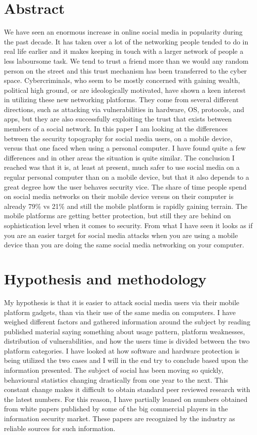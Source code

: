 \section*{Abstract}
We have seen an enormous increase in online social media in popularity during the past decade. It has taken over a lot of the networking people tended to do in real life earlier and it makes keeping in touch with a larger network of people a less laboursome task. We tend to trust a friend more than we would any random person on the street and this trust mechanism has been transferred to the cyber space. Cybercriminals, who seem to be mostly concerned with gaining wealth, political high ground, or are ideologically motivated, have shown a keen interest in utilizing these new networking platforms. They come from several different directions, such as attacking via vulnerabilities in hardware, OS, protocols, and apps, but they are also successfully exploiting the trust that exists between members of a social network.
In this paper I am looking at the differences between the security topography for social media users, on a mobile device, versus that one faced when using a personal computer. I have found quite a few differences and in other areas the situation is quite similar. The conclusion I reached was that it is, at least at present, much safer to use social media on a regular personal computer than on a mobile device, but that it also depends to a great degree how the user behaves security vice. The share of time people spend on social media networks on their mobile device versus on their computer is already 79\% vs 21\% \cite{CrossPlatform2016} and still the mobile platform is rapidly gaining terrain. The mobile platforms are getting better protection, but still they are behind on sophistication level when it comes to security. From what I have seen it looks as if you are an easier target for social media attacks when you are using a mobile device than you are doing the same social media networking on your computer.

\section{Hypothesis and methodology}
My hypothesis is that it is easier to attack social media users via their mobile platform gadgets, than via their use of the same media on computers. I have weighed different factors and gathered information around the subject by reading published material saying something about usage pattern, platform weaknesses, distribution of vulnerabilities, and how the users time is divided between the two platform categories. I have looked at how software and hardware protection is being utilized the two cases and I will in the end try to conclude based upon the information presented.
 The subject of social has been moving so quickly, behavioural statistics changing drastically from one year to the next. This constant change makes it difficult to obtain standard peer reviewed research with the latest numbers. For this reason, I have partially leaned on numbers obtained from white papers published by some of the big commercial players in the information security market. These papers are recognized by the industry as reliable sources for such information.
